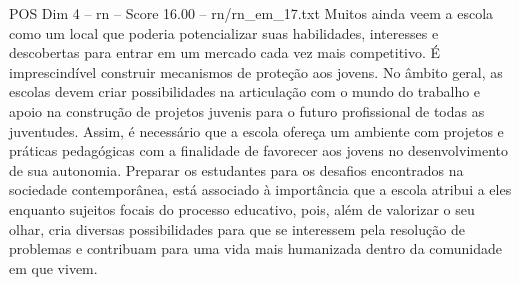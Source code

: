 \begin{textsample}{POS Dim 4 – rn – Score 16.00 – rn/rn\_em\_17.txt}
Muitos ainda veem a escola como um local que poderia potencializar suas habilidades, interesses e descobertas para entrar em um mercado cada vez mais competitivo.
É imprescindível construir mecanismos de proteção aos jovens.
No âmbito geral, as escolas devem criar possibilidades na articulação com o mundo do trabalho e apoio na construção de projetos juvenis para o futuro profissional de todas as juventudes.
Assim, é necessário que a escola ofereça um ambiente com projetos e práticas pedagógicas com a finalidade de favorecer aos jovens no desenvolvimento de sua autonomia.
Preparar os estudantes para os desafios encontrados na sociedade contemporânea, está associado à importância que a escola atribui a eles enquanto sujeitos focais do processo educativo, pois, além de valorizar o seu olhar, cria diversas possibilidades para que se interessem pela resolução de problemas e contribuam para uma vida mais humanizada dentro da comunidade em que vivem.

\end{textsample}
